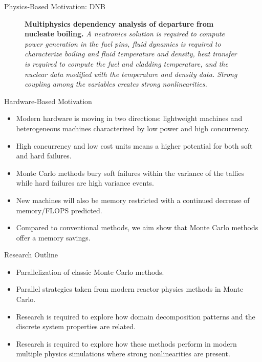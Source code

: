 \documentclass{beamer}
\begin{document}
\begin{frame}{Physics-Based Motivation: DNB}
  \begin{figure}[htpb!]
    \begin{center}
      \scalebox{1}{  }
    \end{center}
    \caption{\textbf{Multiphysics dependency analysis of departure from
        nucleate boiling.} \textit{A neutronics solution is required to
        compute power generation in the fuel pins, fluid dynamics is
        required to characterize boiling and fluid temperature and
        density, heat transfer is required to compute the fuel and
        cladding temperature, and the nuclear data modified with the
        temperature and density data. Strong coupling among the
        variables creates strong nonlinearities.}}
    \label{fig:dnb_example}
  \end{figure}
\end{frame}

\begin{frame}{Hardware-Based Motivation}
  \begin{itemize}
    \item Modern hardware is moving in two directions: lightweight
      machines and heterogeneous machines characterized by low power
      and high concurrency.
    \item High concurrency and low cost units means a higher potential
      for both soft and hard failures.
    \item Monte Carlo methods bury soft failures within the variance
      of the tallies while hard failures are high variance events.
    \item New machines will also be memory restricted with a continued
      decrease of memory/FLOPS predicted.
    \item Compared to conventional methods, we aim show that Monte
      Carlo methods offer a memory savings.
  \end{itemize}
\end{frame}

\begin{frame}{Research Outline}
  \begin{itemize}
    \item Parallelization of classic Monte Carlo methods.
    \item Parallel strategies taken from modern reactor physics
      methods in Monte Carlo.
    \item Research is required to explore how domain decomposition
      patterns and the discrete system properties are related.
    \item Research is required to explore how these methods perform
      in modern multiple physics simulations where strong
      nonlinearities are present.
  \end{itemize}
\end{frame}
\end{document}
